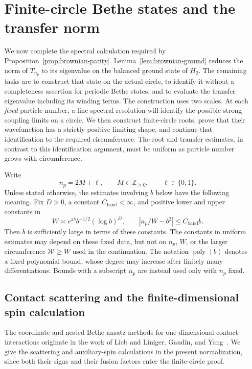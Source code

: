 \section{Finite-circle Bethe states and the transfer norm}\label{sec:bethe}

We now complete the spectral calculation required by
Proposition~\ref{prop:brownian-parity}.  Lemma~\ref{lem:brownian-ground}
reduces the norm of $T_{n_p}$ to its eigenvalue on the balanced ground state
of $H_2$.  The remaining tasks are to construct that state on the actual
circle, to identify it without a completeness assertion for periodic Bethe
states, and to evaluate the transfer eigenvalue including its winding terms.
The construction uses two scales.  At each \emph{fixed} particle number,
a line spectral resolution will identify the possible strong-coupling
limits on a circle.  We then construct finite-circle roots, prove that
their wavefunction has a strictly positive limiting shape,
and continue that identification to the required circumference.
The root and transfer estimates, in contrast to this identification
argument, must be uniform as particle number grows with circumference.

Write
\[
 n_p=2M+\ell,\qquad M\in\mathbb Z_{\geq0},\qquad \ell\in\{0,1\}.
\]
Unless stated otherwise, the estimates involving $b$ below have the following
meaning.  Fix $D>0$, a constant $C_{\mathrm{band}}<\infty$, and positive lower
and upper constants in
\[
 W\asymp e^{\pi b}b^{-1/2}(\log b)^D,
 \qquad |n_p/W-b^2|\leq C_{\mathrm{band}}b.
\]
Then $b$ is sufficiently large in terms of these constants.  The constants
in uniform estimates may depend on these fixed data, but not on $n_p$, $W$,
or the larger circumference $\mathcal W\geq W$ used in the continuation.
The notation $\operatorname{poly}(b)$ denotes a fixed polynomial bound,
whose degree may increase after finitely many differentiations.  Bounds
with a subscript $n_p$ are instead used only with $n_p$ fixed.

\subsection{Contact scattering and the finite-dimensional spin calculation}

The coordinate and nested Bethe-ansatz methods for one-dimensional
contact interactions originate in the work of Lieb and Liniger,
Gaudin, and Yang~\cite{LiebLiniger1963,Gaudin1967,Yang1967}.
We give the scattering and auxiliary-spin calculations in the present
normalization, since both their signs and their fusion factors enter
the finite-circle proof.

